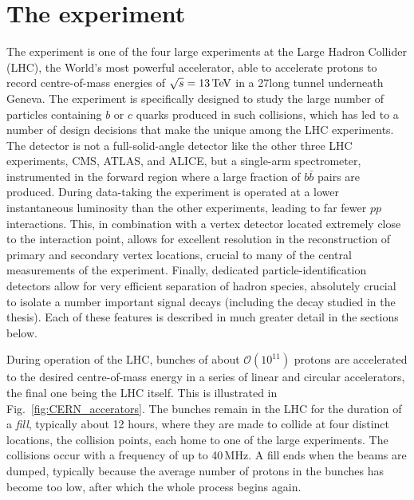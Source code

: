 

\chapter{The \lhcb experiment}
\label{ch:3-detector}


The \lhcb experiment is one of the four large experiments at the Large Hadron Collider (LHC), the World's most powerful accelerator, able to accelerate protons to record centre-of-mass energies of $\sqrt{s}=13\text{\,Te\kern -0.1em V}$ in a 27\km long tunnel underneath Geneva. The \lhcb experiment is specifically designed to study the large number of particles containing $b$ or $c$ quarks produced in such collisions, which has led to a number of design decisions that make the \lhcb unique among the LHC experiments. The \lhcb detector is not a full-solid-angle detector like the other three LHC experiments, CMS, ATLAS, and ALICE, but a single-arm spectrometer, instrumented in the forward region where a large fraction of $b\bar b$ pairs are produced. During data-taking the experiment is operated at a lower instantaneous luminosity than the other experiments, leading to far fewer $pp$ interactions. This, in combination with a vertex detector located extremely close to the interaction point, allows for excellent resolution in the reconstruction of primary and secondary vertex locations, crucial to many of the central measurements of the experiment. Finally, dedicated particle-identification detectors allow for very efficient separation of hadron species, absolutely crucial to isolate a number important signal decays (including the \BtoDK decay studied in the thesis). Each of these features is described in much greater detail in the sections below.



During operation of the LHC, bunches of about $\mathcal O(10^{11})$ protons are accelerated to the desired centre-of-mass energy in a series of linear and circular accelerators, the final one being the LHC itself. This is illustrated in Fig.~\ref{fig:CERN_accerators}. The bunches remain in the LHC for the duration of a \emph{fill}, typically about 12 hours, where they are made to collide at four distinct locations, the collision points, each home to one of the large experiments. The collisions occur with a frequency of up to 40\,MHz. A fill ends when the beams are dumped, typically because the average number of protons in the bunches has become too low, after which the whole process begins again.

